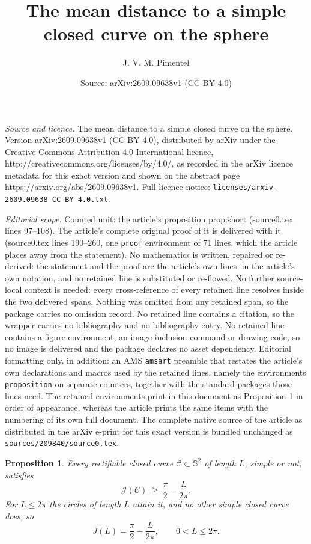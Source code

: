 \documentclass[10pt,a4paper]{amsart}
\title{The mean distance to a simple closed curve on the sphere}
\author{J. V. M. Pimentel}
\date{Source: arXiv:2609.09638v1 (CC BY 4.0)}
\newtheorem{proposition}{Proposition}
\newcommand{\Sph}{\mathbb{S}^{2}}
\begin{document}
\maketitle

\noindent\emph{Source and licence.} The mean distance to a simple closed curve on the sphere. Version arXiv:2609.09638v1 (CC BY 4.0), distributed by arXiv under the Creative Commons Attribution 4.0 International licence, http://creativecommons.org/licenses/by/4.0/, as recorded in the arXiv licence metadata for this exact version and shown on the abstract page https://arxiv.org/abs/2609.09638v1. Full licence notice: \texttt{licenses/arxiv-2609.09638-CC-BY-4.0.txt}.\par\smallskip

\noindent\textit{Editorial scope.} Counted unit: the article's proposition prop:short (source0.tex lines 97--108). The article's complete original proof of it is delivered with it (source0.tex lines 190--260, one \texttt{proof} environment of 71 lines, which the article places away from the statement). No mathematics is written, repaired or re-derived: the statement and the proof are the article's own lines, in the article's own notation, and no retained line is substituted or re-flowed.  No further source-local context is needed: every cross-reference of every retained line resolves inside the two delivered spans.  Nothing was omitted from any retained span, so the package carries no omission record.  No retained line contains a citation, so the wrapper carries no bibliography and no bibliography entry.  No retained line contains a figure environment, an image-inclusion command or drawing code, so no image is delivered and the package declares no asset dependency.  Editorial formatting only, in addition: an AMS \texttt{amsart} preamble that restates the article's own declarations and macros used by the retained lines, namely the environments \texttt{proposition} on separate counters, together with the standard packages those lines need.  The retained environments print in this document as Proposition 1 in order of appearance, whereas the article prints the same items with the numbering of its own full document.  The complete native source of the article as distributed in the arXiv e-print for this exact version is bundled unchanged as \texttt{sources/209840/source0.tex}.
\begin{proposition}\label{prop:short}
Every rectifiable closed curve $\mathcal{C}\subset\Sph$ of length $L$, simple or
not, satisfies
\begin{equation}\label{eq:short}
  \mathcal{J}(\mathcal{C})\ \ge\ \frac{\pi}{2}-\frac{L}{2\pi} .
\end{equation}
For $L\le2\pi$ the circles of length $L$ attain it, and no other simple closed
curve does, so
\begin{equation}
  J(L)=\frac{\pi}{2}-\frac{L}{2\pi},\qquad 0<L\le2\pi .
\end{equation}
\end{proposition}
\end{document}
